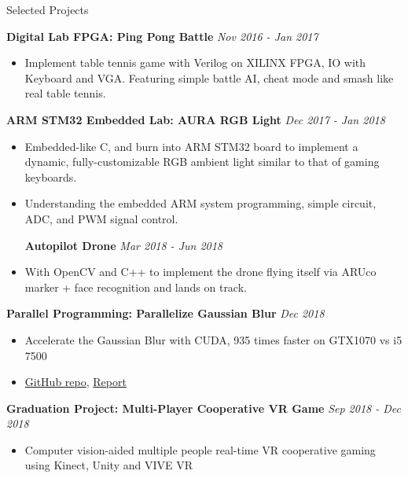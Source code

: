 \documentclass{resume} %
\begin{document}
\begin{rSection}{Selected Projects}

{\bf Digital Lab FPGA: Ping Pong Battle} \hfill {\em Nov 2016 - Jan 2017}
\begin{itemize}
    \item Implement table tennis game with Verilog on XILINX FPGA, IO with Keyboard and VGA. Featuring simple battle AI, cheat mode and smash like real table tennis.
\end{itemize}

{\bf ARM STM32 Embedded Lab: AURA RGB Light } \hfill {\em Dec 2017 - Jan 2018}
\begin{itemize}
    \item Embedded-like C, and burn into ARM STM32 board to implement a dynamic, fully-customizable RGB ambient light similar to that of gaming keyboards. 
    \item Understanding the embedded ARM system programming, simple circuit, ADC, and PWM signal control.

{\bf Autopilot Drone} \hfill {\em Mar 2018 - Jun 2018}
\item With OpenCV and C++ to implement the drone flying itself via ARUco marker + face recognition and lands on track.
\end{itemize}

{\bf Parallel Programming: Parallelize Gaussian Blur} \hfill {\em Dec 2018}
\begin{itemize}
    \item Accelerate the Gaussian Blur with CUDA, 935 times faster on GTX1070 vs i5 7500
    \item \href{https://github.com/Alfons0329/Parallel_Programming_Fall_2018/tree/master/Final\%20Project}{GitHub repo}, \href{https://github.com/Alfons0329/Parallel_Programming_Fall_2018/blob/master/Final\%20Project/Team24_Final_Project_Report.pdf}{Report}
\end{itemize}

{\bf Graduation Project: Multi-Player Cooperative VR Game} \hfill {\em Sep 2018 - Dec 2018}
\begin{itemize}
    \item Computer vision-aided multiple people real-time VR cooperative gaming using Kinect, Unity and VIVE VR
\end{itemize}
\end{rSection}
\end{document}
